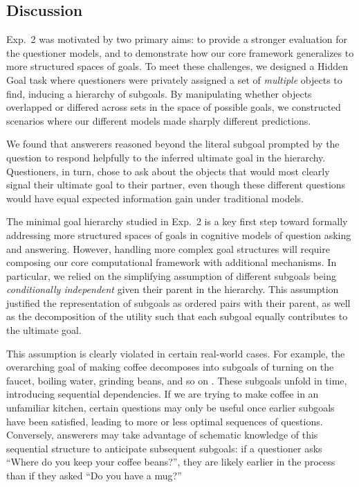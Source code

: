 \documentclass[11pt, floatsintext]{apa6}
\begin{document}
\subsection{Discussion}

Exp.~2 was motivated by two primary aims: to provide a stronger evaluation for the questioner models, and to demonstrate how our core framework generalizes to more structured spaces of goals.
To meet these challenges, we designed a Hidden Goal task where questioners were privately assigned a set of \emph{multiple} objects to find, inducing a hierarchy of subgoals.
By manipulating whether objects overlapped or differed across sets in the space of possible goals, we constructed scenarios where our different models made sharply different predictions. 

We found that answerers reasoned beyond the literal subgoal prompted by the question to respond helpfully to the inferred ultimate goal in the hierarchy.
Questioners, in turn, chose to ask about the objects that would most clearly signal their ultimate goal to their partner, even though these different questions would have equal expected information gain under traditional models. 

The minimal goal hierarchy studied in Exp.~2 is a key first step toward formally addressing more structured spaces of goals in cognitive models of question asking and answering. 
However, handling more complex goal structures will require composing our core computational framework with additional mechanisms.
In particular, we relied on the simplifying assumption of different subgoals being \emph{conditionally independent} given their parent in the hierarchy. 
This assumption justified the representation of subgoals as ordered pairs with their parent, as well as the decomposition of the utility such that each subgoal equally contributes to the ultimate goal. 

This assumption is clearly violated in certain real-world cases.
For example, the overarching goal of making coffee decomposes into subgoals of turning on the faucet, boiling water, grinding beans, and so on \cite{jackendoff2007language}. 
These subgoals unfold in time, introducing sequential dependencies.
If we are trying to make coffee in an unfamiliar kitchen, certain questions may only be useful once earlier subgoals have been satisfied, leading to more or less optimal sequences of questions.
Conversely, answerers may take advantage of schematic knowledge of this sequential structure to anticipate subsequent subgoals: if a questioner asks ``Where do you keep your coffee beans?'', they are likely earlier in the process than if they asked ``Do you have a mug?'' 
\end{document}
